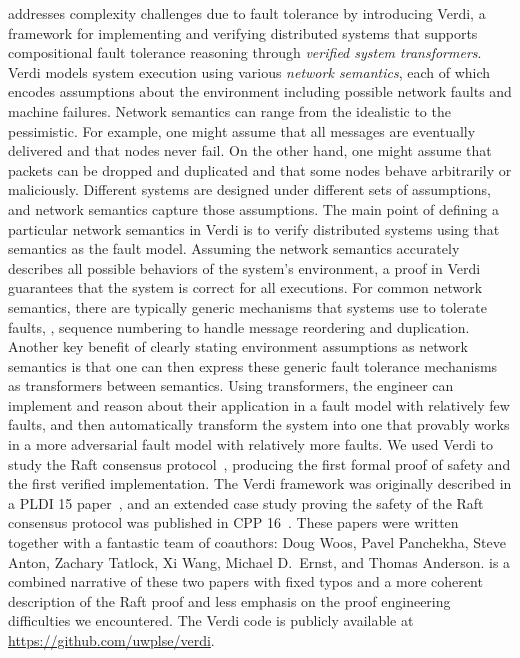  addresses complexity challenges due to fault tolerance
  by introducing Verdi,
  a \Coq~\cite{Coq} framework for implementing and verifying distributed systems
  that supports compositional fault tolerance reasoning
  through \emph{verified system transformers}.
Verdi models system execution using various \emph{network semantics},
  each of which encodes assumptions about the environment
  including possible network faults and machine failures.
Network semantics can range from the idealistic to the pessimistic.
For example, one might assume that
  all messages are eventually delivered and that nodes never fail.
On the other hand, one might assume that
  packets can be dropped and duplicated and that
  some nodes behave arbitrarily or maliciously.
Different systems are designed under different sets of assumptions,
  and network semantics capture those assumptions.
The main point of defining a particular network semantics in Verdi is
  to verify distributed systems using that semantics as the fault model.
Assuming the network semantics accurately describes
  all possible behaviors of the system's environment,
  a proof in Verdi guarantees that the system is correct for all executions.
For common network semantics,
  there are typically generic mechanisms that systems use to tolerate faults,
  \eg, sequence numbering to handle message reordering and duplication.
Another key benefit of
  clearly stating environment assumptions as network semantics is that
  one can then express these generic fault tolerance mechanisms
  as transformers between semantics.
Using transformers, the engineer can
  implement and reason about their application
  in a fault model with relatively few faults, and
  then automatically transform the system into one
  that provably works in a more adversarial fault model
  with relatively more faults.
We used Verdi to study the Raft consensus protocol~\cite{ongaro:raft},
  producing the first formal proof of safety
  and the first verified implementation.
The Verdi framework was originally described in a PLDI 15 paper~\cite{Wilcox-al:PLDI15},
  and an extended case study proving
  the safety of the Raft consensus protocol was published in CPP 16~\cite{Woos-al:CPP16}.
These papers were written together with a fantastic team of coauthors:
  Doug Woos, Pavel Panchekha, Steve Anton, Zachary Tatlock, Xi Wang, Michael D.\ Ernst, and Thomas Anderson.
 is a combined narrative of these two papers
  with fixed typos and a more coherent description of the Raft proof
  and less emphasis on the proof engineering difficulties we encountered.
The Verdi code is publicly available at \url{https://github.com/uwplse/verdi}.


